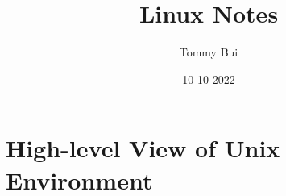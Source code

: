 \documentclass{article}
\title{Linux Notes}
\date{10-10-2022}
\author{Tommy Bui}
\begin{document}
	\maketitle
	\newpage
	
	\section{High-level View of Unix Environment}
	
\end{document}
